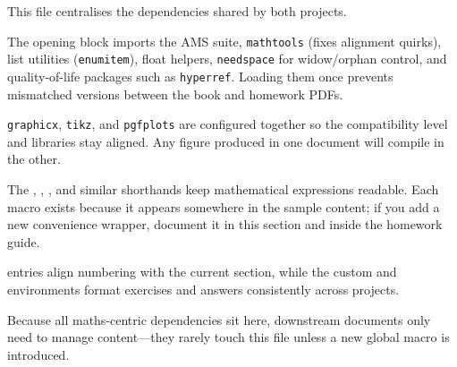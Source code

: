 \label{sec:core-base}

This file centralises the dependencies shared by both projects.
\begin{description}[leftmargin=2.6em,labelwidth=2.4em]
  \item[\textbf{Math \& layout packages}] The opening \InlineMacro{\usepackage}
        block imports the AMS suite, \texttt{mathtools} (fixes alignment quirks),
        list utilities (\texttt{enumitem}), float helpers, \texttt{needspace} for
        widow/orphan control, and quality-of-life packages such as
        \texttt{hyperref}. Loading them once prevents mismatched versions between
        the book and homework PDFs.
  \item[\textbf{Graphics stack}] \texttt{graphicx}, \texttt{tikz}, and
        \texttt{pgfplots} are configured together so the compatibility level and
        libraries stay aligned. Any figure produced in one document will compile
        in the other.
  \item[\textbf{Utility macros}] The \InlineMacro{\vect}, \InlineMacro{\mat},
        \InlineMacro{\R}, and similar shorthands keep mathematical expressions
        readable. Each macro exists because it appears somewhere in the sample
        content; if you add a new convenience wrapper, document it in this
        section and inside the homework guide.
  \item[\textbf{Environment definitions}] \InlineMacro{\newtheorem} entries align
        numbering with the current section, while the custom
        \InlineMacro{\textbookproblem} and \InlineMacro{\solutionbox}
        environments format exercises and answers consistently across projects.
\end{description}
Because all maths-centric dependencies sit here, downstream documents only need
to manage content—they rarely touch this file unless a new global macro is
introduced.

\label{sec:styles-notes}

